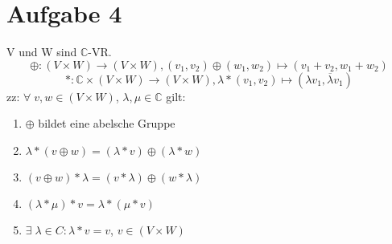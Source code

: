 \documentclass[10pt,a4paper]{article}
\begin{document}
\section{Aufgabe 4}
V und W sind $\mathbb{C}$-VR.\\
\begin{equation*}
\oplus : (V\times W) \rightarrow (V\times W) , (v_1,v_2) \oplus (w_1,w_2) \mapsto (v_1+v_2,w_1+w_2) 
\end{equation*}
\begin{equation*}
* :  \mathbb{C}\times (V\times W) \rightarrow (V\times W) , \lambda * (v_1,v_2) \mapsto (\lambda v_1,\overline{\lambda} v_1) 
\end{equation*}
zz: $\forall\; v,w \in (V\times W)$, $\lambda, \mu \in \mathbb{C}$ gilt:
\begin{enumerate}
\item $\oplus$ bildet eine abelsche Gruppe 
\item $\lambda *(v \oplus w) = (\lambda *v ) \oplus (\lambda * w)  $
\item $(v \oplus w)*\lambda = (v*\lambda ) \oplus (w*\lambda)  $
\item $(\lambda * \mu )*v = \lambda *(\mu *v)$
\item $ \exists\; \lambda \in C : \lambda*v = v $, $v \in (V \times W)$
\end{enumerate}
\end{document}
